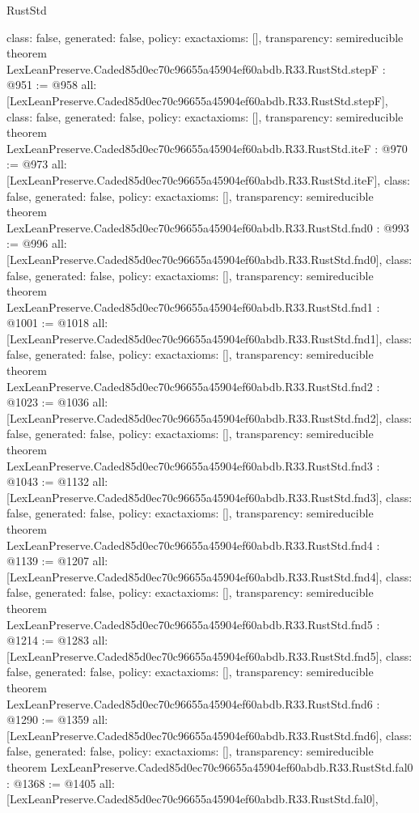 \begin{lexlean}{RustStd}
\begin{coremodule}
{  class: false,
  generated: false,
  policy: exact{axioms: []},
  transparency: semireducible
}
theorem LexLeanPreserve.Caded85d0ec70c96655a45904ef60abdb.R33.RustStd.stepF : @951 := @958 {
  all: [LexLeanPreserve.Caded85d0ec70c96655a45904ef60abdb.R33.RustStd.stepF],
  class: false,
  generated: false,
  policy: exact{axioms: []},
  transparency: semireducible
}
theorem LexLeanPreserve.Caded85d0ec70c96655a45904ef60abdb.R33.RustStd.iteF : @970 := @973 {
  all: [LexLeanPreserve.Caded85d0ec70c96655a45904ef60abdb.R33.RustStd.iteF],
  class: false,
  generated: false,
  policy: exact{axioms: []},
  transparency: semireducible
}
theorem LexLeanPreserve.Caded85d0ec70c96655a45904ef60abdb.R33.RustStd.fnd0 : @993 := @996 {
  all: [LexLeanPreserve.Caded85d0ec70c96655a45904ef60abdb.R33.RustStd.fnd0],
  class: false,
  generated: false,
  policy: exact{axioms: []},
  transparency: semireducible
}
theorem LexLeanPreserve.Caded85d0ec70c96655a45904ef60abdb.R33.RustStd.fnd1 : @1001 := @1018 {
  all: [LexLeanPreserve.Caded85d0ec70c96655a45904ef60abdb.R33.RustStd.fnd1],
  class: false,
  generated: false,
  policy: exact{axioms: []},
  transparency: semireducible
}
theorem LexLeanPreserve.Caded85d0ec70c96655a45904ef60abdb.R33.RustStd.fnd2 : @1023 := @1036 {
  all: [LexLeanPreserve.Caded85d0ec70c96655a45904ef60abdb.R33.RustStd.fnd2],
  class: false,
  generated: false,
  policy: exact{axioms: []},
  transparency: semireducible
}
theorem LexLeanPreserve.Caded85d0ec70c96655a45904ef60abdb.R33.RustStd.fnd3 : @1043 := @1132 {
  all: [LexLeanPreserve.Caded85d0ec70c96655a45904ef60abdb.R33.RustStd.fnd3],
  class: false,
  generated: false,
  policy: exact{axioms: []},
  transparency: semireducible
}
theorem LexLeanPreserve.Caded85d0ec70c96655a45904ef60abdb.R33.RustStd.fnd4 : @1139 := @1207 {
  all: [LexLeanPreserve.Caded85d0ec70c96655a45904ef60abdb.R33.RustStd.fnd4],
  class: false,
  generated: false,
  policy: exact{axioms: []},
  transparency: semireducible
}
theorem LexLeanPreserve.Caded85d0ec70c96655a45904ef60abdb.R33.RustStd.fnd5 : @1214 := @1283 {
  all: [LexLeanPreserve.Caded85d0ec70c96655a45904ef60abdb.R33.RustStd.fnd5],
  class: false,
  generated: false,
  policy: exact{axioms: []},
  transparency: semireducible
}
theorem LexLeanPreserve.Caded85d0ec70c96655a45904ef60abdb.R33.RustStd.fnd6 : @1290 := @1359 {
  all: [LexLeanPreserve.Caded85d0ec70c96655a45904ef60abdb.R33.RustStd.fnd6],
  class: false,
  generated: false,
  policy: exact{axioms: []},
  transparency: semireducible
}
theorem LexLeanPreserve.Caded85d0ec70c96655a45904ef60abdb.R33.RustStd.fal0 : @1368 := @1405 {
  all: [LexLeanPreserve.Caded85d0ec70c96655a45904ef60abdb.R33.RustStd.fal0],
}
\end{coremodule}
\end{lexlean}
